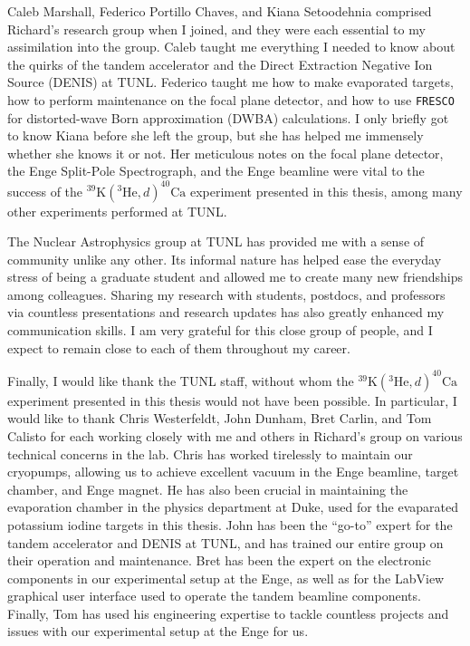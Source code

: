 \begin{acknowledgements}
Caleb Marshall, Federico Portillo Chaves, and Kiana Setoodehnia comprised Richard's research group when I joined, and they were each essential to my assimilation into the group. Caleb taught me everything I needed to know about the quirks of the tandem accelerator and the Direct Extraction Negative Ion Source (DENIS) at TUNL. Federico taught me how to make evaporated targets, how to perform maintenance on the focal plane detector, and how to use \texttt{FRESCO} for distorted-wave Born approximation (DWBA) calculations. I only briefly got to know Kiana before she left the group, but she has helped me immensely whether she knows it or not. Her meticulous notes on the focal plane detector, the Enge Split-Pole Spectrograph, and the Enge beamline were vital to the success of the $^{39}\mathrm{K}(^{3}\mathrm{He},d)^{40}\mathrm{Ca}$ experiment presented in this thesis, among many other experiments performed at TUNL.

The Nuclear Astrophysics group at TUNL has provided me with a sense of community unlike any other. Its informal nature has helped ease the everyday stress of being a graduate student and allowed me to create many new friendships among colleagues. Sharing my research with students, postdocs, and professors via countless presentations and research updates has also greatly enhanced my communication skills. I am very grateful for this close group of people, and I expect to remain close to each of them throughout my career.

Finally, I would like thank the TUNL staff, without whom the $^{39}\mathrm{K}(^{3}\mathrm{He},d)^{40}\mathrm{Ca}$ experiment presented in this thesis would not have been possible. In particular, I would like to thank Chris Westerfeldt, John Dunham, Bret Carlin, and Tom Calisto for each working closely with me and others in Richard's group on various technical concerns in the lab. Chris has worked tirelessly to maintain our cryopumps, allowing us to achieve excellent vacuum in the Enge beamline, target chamber, and Enge magnet. He has also been crucial in maintaining the evaporation chamber in the physics department at Duke, used for the evaparated potassium iodine targets in this thesis. John has been the ``go-to'' expert for the tandem accelerator and DENIS at TUNL, and has trained our entire group on their operation and maintenance. Bret has been the expert on the electronic components in our experimental setup at the Enge, as well as for the LabView graphical user interface used to operate the tandem beamline components. Finally, Tom has used his engineering expertise to tackle countless projects and issues with our experimental setup at the Enge for us.

\end{acknowledgements}

\thesistableofcontents

\thesislistoftables

\thesislistoffigures
